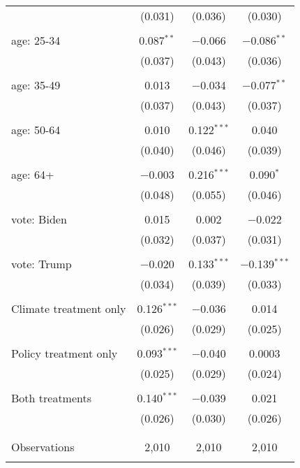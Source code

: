 \begin{tabular}{@{\extracolsep{5pt}}lccc}
  & (0.031) & (0.036) & (0.030) \\ 
  & & & \\ 
 age: 25-34 & 0.087$^{**}$ & $-$0.066 & $-$0.086$^{**}$ \\ 
  & (0.037) & (0.043) & (0.036) \\ 
  & & & \\ 
 age: 35-49 & 0.013 & $-$0.034 & $-$0.077$^{**}$ \\ 
  & (0.037) & (0.043) & (0.037) \\ 
  & & & \\ 
 age: 50-64 & 0.010 & 0.122$^{***}$ & 0.040 \\ 
  & (0.040) & (0.046) & (0.039) \\ 
  & & & \\ 
 age: 64+ & $-$0.003 & 0.216$^{***}$ & 0.090$^{*}$ \\ 
  & (0.048) & (0.055) & (0.046) \\ 
  & & & \\ 
 vote: Biden & 0.015 & 0.002 & $-$0.022 \\ 
  & (0.032) & (0.037) & (0.031) \\ 
  & & & \\ 
 vote: Trump & $-$0.020 & 0.133$^{***}$ & $-$0.139$^{***}$ \\ 
  & (0.034) & (0.039) & (0.033) \\ 
  & & & \\ 
 Climate treatment only & 0.126$^{***}$ & $-$0.036 & 0.014 \\ 
  & (0.026) & (0.029) & (0.025) \\ 
  & & & \\ 
 Policy treatment only & 0.093$^{***}$ & $-$0.040 & 0.0003 \\ 
  & (0.025) & (0.029) & (0.024) \\ 
  & & & \\ 
 Both treatments & 0.140$^{***}$ & $-$0.039 & 0.021 \\ 
  & (0.026) & (0.030) & (0.026) \\ 
  & & & \\ 
\hline \\[-1.8ex] 

Observations & 2,010 & 2,010 & 2,010 \\ 
\hline 
\hline \\[-1.8ex] 
\end{tabular} 